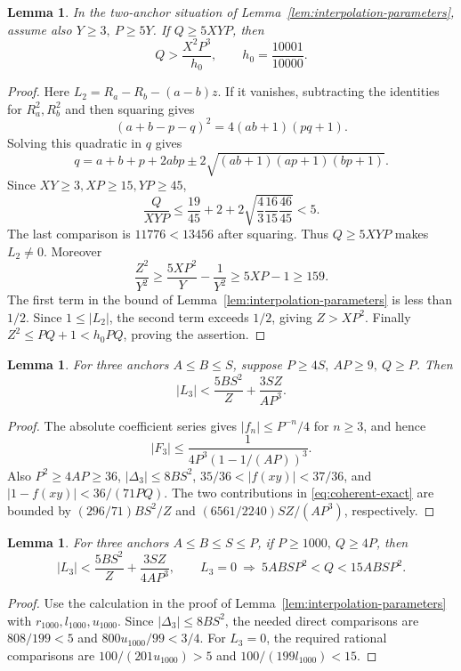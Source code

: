 \documentclass[12pt]{article}
\newtheorem{lemma}[theorem]{Lemma}
\numberwithin{equation}{section}
\begin{document}
\begin{lemma}\label{lem:strong-two-anchor}
In the two-anchor situation of Lemma~\ref{lem:interpolation-parameters},
assume also \(Y\ge3,\ P\ge5Y\). If \(Q\ge5XYP\), then
\[
 Q>\frac{X^2P^3}{h_0},\qquad h_0=\frac{10001}{10000}.
\]
\end{lemma}
\begin{proof}
Here \(L_2=R_a-R_b-(a-b)z\). If it vanishes, subtracting the identities
for \(R_a^2,R_b^2\) and then squaring gives
\[
 (a+b-p-q)^2=4(ab+1)(pq+1).
\]
Solving this quadratic in \(q\) gives
\[
 q=a+b+p+2abp\pm2\sqrt{(ab+1)(ap+1)(bp+1)}.
\]
Since \(XY\ge3,XP\ge15,YP\ge45\),
\[
 \frac{Q}{XYP}\le\frac{19}{45}+2+
             2\sqrt{\frac43\frac{16}{15}\frac{46}{45}}<5.
\]
The last comparison is \(11776<13456\) after squaring.
Thus \(Q\ge5XYP\) makes \(L_2\ne0\). Moreover
\[
 \frac{Z^2}{Y^2}\ge\frac{5XP^2}{Y}-\frac1{Y^2}
 \ge5XP-1\ge159.
\]
The first term in the bound of Lemma~\ref{lem:interpolation-parameters}
is less than \(1/2\). Since \(1\le|L_2|\), the second term exceeds
\(1/2\), giving \(Z>XP^2\).
Finally \(Z^2\le PQ+1<h_0PQ\), proving the assertion.
\end{proof}

\begin{lemma}\label{lem:general-three}
For three anchors \(A\le B\le S\), suppose \(P\ge4S,\ AP\ge9,\ Q\ge P\).
Then
\[
 |L_3|<\frac{5BS^2}{Z}+\frac{3SZ}{AP^3}.
\]
\end{lemma}
\begin{proof}
The absolute coefficient series gives \(|f_n|\le P^{-n}/4\) for \(n\ge3\),
and hence
\[
 |F_3|\le\frac1{4P^3(1-1/(AP))^3}.
\]
Also \(P^2\ge4AP\ge36\), \(|\Delta_3|\le8BS^2\),
\(35/36<|f(xy)|<37/36\), and
\(|1-f(xy)|<36/(71PQ)\). The two contributions in
\eqref{eq:coherent-exact} are bounded by
\((296/71)BS^2/Z\) and \((6561/2240)SZ/(AP^3)\), respectively.
\end{proof}

\begin{lemma}\label{lem:separated-three}
For three anchors \(A\le B\le S\le P\), if \(P\ge1000,\ Q\ge4P\), then
\[
 |L_3|<\frac{5BS^2}{Z}+\frac{3SZ}{4AP^3},\qquad
 L_3=0\ \Longrightarrow\ 5ABSP^2<Q<15ABSP^2.
\]
\end{lemma}
\begin{proof}
Use the calculation in the proof of Lemma~\ref{lem:interpolation-parameters}
with \(r_{1000},l_{1000},u_{1000}\).
Since \(|\Delta_3|\le8BS^2\), the needed direct comparisons are
\(808/199<5\) and \(800u_{1000}/99<3/4\).
For \(L_3=0\), the required rational comparisons are
\(100/(201u_{1000})>5\) and \(100/(199l_{1000})<15\).
\end{proof}
\end{document}
